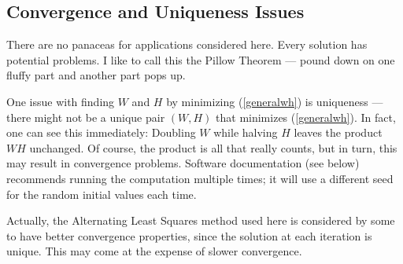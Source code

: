 % 
% 
% 
% 
% 

\subsection{Convergence and Uniqueness Issues}

There are no panaceas for applications considered here.  Every solution
has potential problems.  I like to call this the Pillow Theorem ---
pound down on one fluffy part and another part pops up.

One issue with finding $W$ and $H$ by minimizing (\ref{generalwh}) is
uniqueness --- there might not be a unique pair $(W,H)$ that minimizes
(\ref{generalwh}).  In fact, one can see this immediately:  Doubling $W$
while halving $H$ leaves the product $WH$ unchanged.  Of course, the
product is all that really counts, but in turn, this may result in
convergence problems. Software documentation (see below) recommends
running the computation multiple times; it will use a different seed for
the random initial values each time.

Actually, the Alternating Least Squares method used here is considered
by some to have better convergence properties, since the solution at
each iteration is unique.  This may come at the expense of slower
convergence.

